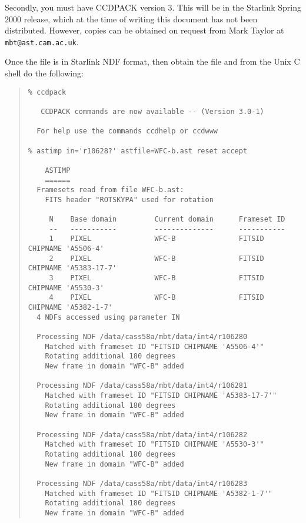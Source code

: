 \documentclass[11pt]{article}
\newenvironment{squote}{\begin{quote}\small}{\end{quote}}
\begin{document}
Secondly, you must have CCDPACK version 3.
This will be in the Starlink Spring 2000 release, which at the time
of writing this document has not been distributed.
However, copies can be obtained on request from Mark Taylor 
at {\tt mbt@ast.cam.ac.uk}.



Once the file is in Starlink NDF format, then obtain the file 
and from the Unix C shell do the following:
\begin{squote}
\begin{verbatim}
% ccdpack 

   CCDPACK commands are now available -- (Version 3.0-1)
   
  For help use the commands ccdhelp or ccdwww

% astimp in='r10628?' astfile=WFC-b.ast reset accept

    ASTIMP
    ======
  Framesets read from file WFC-b.ast:
    FITS header "ROTSKYPA" used for rotation

     N    Base domain         Current domain      Frameset ID
     --   -----------         --------------      -----------
     1    PIXEL               WFC-B               FITSID CHIPNAME 'A5506-4'
     2    PIXEL               WFC-B               FITSID CHIPNAME 'A5383-17-7'
     3    PIXEL               WFC-B               FITSID CHIPNAME 'A5530-3'
     4    PIXEL               WFC-B               FITSID CHIPNAME 'A5382-1-7'
  4 NDFs accessed using parameter IN

  Processing NDF /data/cass58a/mbt/data/int4/r106280
    Matched with frameset ID "FITSID CHIPNAME 'A5506-4'"
    Rotating additional 180 degrees
    New frame in domain "WFC-B" added

  Processing NDF /data/cass58a/mbt/data/int4/r106281
    Matched with frameset ID "FITSID CHIPNAME 'A5383-17-7'"
    Rotating additional 180 degrees
    New frame in domain "WFC-B" added

  Processing NDF /data/cass58a/mbt/data/int4/r106282
    Matched with frameset ID "FITSID CHIPNAME 'A5530-3'"
    Rotating additional 180 degrees
    New frame in domain "WFC-B" added

  Processing NDF /data/cass58a/mbt/data/int4/r106283
    Matched with frameset ID "FITSID CHIPNAME 'A5382-1-7'"
    Rotating additional 180 degrees
    New frame in domain "WFC-B" added
\end{verbatim}
\end{squote}
\end{document}
